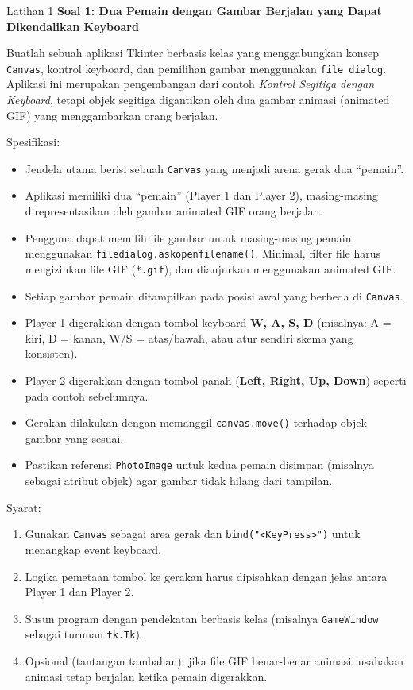 \documentclass[aspectratio=169, table]{beamer}
\begin{document}
\begin{frame}[fragile,allowframebreaks=0.8]{Latihan 1}
\footnotesize
\textbf{Soal 1: Dua Pemain dengan Gambar Berjalan yang Dapat Dikendalikan Keyboard}\par\medskip
Buatlah sebuah aplikasi Tkinter berbasis kelas yang menggabungkan konsep \texttt{Canvas}, kontrol keyboard, dan pemilihan gambar menggunakan \texttt{file dialog}. Aplikasi ini merupakan pengembangan dari contoh \emph{Kontrol Segitiga dengan Keyboard}, tetapi objek segitiga digantikan oleh dua gambar animasi (animated GIF) yang menggambarkan orang berjalan.

Spesifikasi:
\begin{itemize}
    \item Jendela utama berisi sebuah \texttt{Canvas} yang menjadi arena gerak dua ``pemain''.
    \item Aplikasi memiliki dua ``pemain'' (Player 1 dan Player 2), masing-masing direpresentasikan oleh gambar animated GIF orang berjalan.
    \item Pengguna dapat memilih file gambar untuk masing-masing pemain menggunakan \texttt{filedialog.askopenfilename()}. Minimal, filter file harus mengizinkan file GIF (\texttt{*.gif}), dan dianjurkan menggunakan animated GIF.
    \item Setiap gambar pemain ditampilkan pada posisi awal yang berbeda di \texttt{Canvas}.
    \item Player 1 digerakkan dengan tombol keyboard \textbf{W, A, S, D} (misalnya: A = kiri, D = kanan, W/S = atas/bawah, atau atur sendiri skema yang konsisten).
    \item Player 2 digerakkan dengan tombol panah (\textbf{Left, Right, Up, Down}) seperti pada contoh sebelumnya.
    \item Gerakan dilakukan dengan memanggil \texttt{canvas.move()} terhadap objek gambar yang sesuai.
    \item Pastikan referensi \texttt{PhotoImage} untuk kedua pemain disimpan (misalnya sebagai atribut objek) agar gambar tidak hilang dari tampilan.
\end{itemize}

Syarat:
\begin{enumerate}
    \item Gunakan \texttt{Canvas} sebagai area gerak dan \texttt{bind("<KeyPress>")} untuk menangkap event keyboard.
    \item Logika pemetaan tombol ke gerakan harus dipisahkan dengan jelas antara Player 1 dan Player 2.
    \item Susun program dengan pendekatan berbasis kelas (misalnya \texttt{GameWindow} sebagai turunan \texttt{tk.Tk}).
    \item Opsional (tantangan tambahan): jika file GIF benar-benar animasi, usahakan animasi tetap berjalan ketika pemain digerakkan.
\end{enumerate}
\end{frame}
\end{document}
